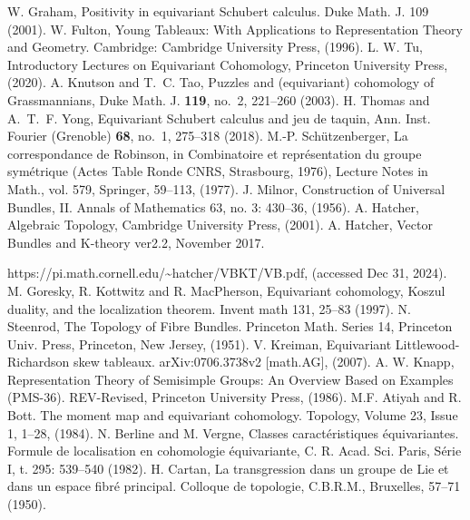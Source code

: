 \begin{thebibliography}{99}
  
   W. Graham, Positivity in equivariant Schubert calculus. Duke Math. J. 109 (2001).
   W. Fulton, Young Tableaux: With Applications to Representation Theory and Geometry. Cambridge: Cambridge University Press, (1996).
   L. W. Tu, Introductory Lectures on Equivariant Cohomology, Princeton University Press, (2020).
   A. Knutson and T.~C. Tao, Puzzles and (equivariant) cohomology of Grassmannians, Duke Math. J. {\bf 119}, no.~2, 221--260  (2003).
   H. Thomas and A.~T.~F. Yong, Equivariant Schubert calculus and jeu de taquin, Ann. Inst. Fourier (Grenoble) {\bf 68}, no.~1, 275--318 (2018). 
  M.-P. Schützenberger, La correspondance de Robinson, in Combinatoire et
  repr\'esentation du groupe sym\'etrique (Actes Table Ronde CNRS, Strasbourg, 1976),
  Lecture Notes in Math., vol. 579, Springer, 59--113, (1977).
   J. Milnor, Construction of Universal Bundles, II. Annals of Mathematics 63, no. 3: 430--36, (1956).
   A. Hatcher, Algebraic Topology, Cambridge University Press, (2001).
   A. Hatcher, Vector Bundles and K-theory ver2.2, November 2017. 
  
  https://pi.math.cornell.edu/\textasciitilde hatcher/VBKT/VB.pdf, (accessed Dec 31, 2024).
   M. Goresky, R. Kottwitz and R. MacPherson, Equivariant cohomology, Koszul duality, and the localization theorem. Invent math 131, 25--83 (1997).
   N. Steenrod, The Topology of Fibre Bundles. Princeton Math. Series 14,
  Princeton Univ. Press, Princeton, New Jersey, (1951).
   V. Kreiman, Equivariant Littlewood-Richardson skew tableaux. arXiv:0706.3738v2 [math.AG], (2007).
   A. W. Knapp, Representation Theory of Semisimple Groups: An Overview Based on Examples (PMS-36). REV-Revised, Princeton University Press, (1986). 
   M.F. Atiyah and R. Bott.
  The moment map and equivariant cohomology.
  Topology,
  Volume 23, Issue 1, 1--28, (1984).
   N. Berline and M. Vergne, Classes caract\'eristiques \'equivariantes. Formule
  de localisation en cohomologie \'equivariante, C. R. Acad. Sci. Paris, S\'erie
  I, t. 295: 539--540 (1982).
  H. Cartan, La transgression dans un groupe de Lie et dans un espace fibr\'e principal. Colloque de
  topologie, C.B.R.M., Bruxelles, 57--71 (1950).
\end{thebibliography}
